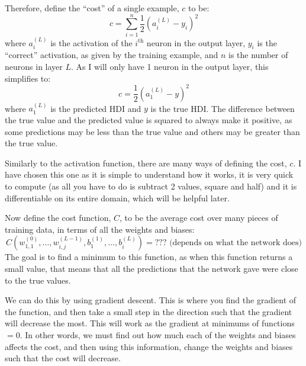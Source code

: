 \documentclass[12pt]{report}
\begin{document}
Therefore, define the ``cost'' of a single example, $c$ to be: 
\begin{equation}\label{eq:cdefinition}
    c=\displaystyle\sum_{i=1}^{n}\frac{1}{2}{\left(a^{\left(L\right)}_i-y_i\right)}^2
\end{equation}
where $a^{\left(L\right)}_i$ is the activation of the $i^{\text{th}}$ neuron in the output layer, $y_i$ is the ``correct'' activation, as given by the training example, and $n$ is the number of neurons in layer $L$. As I will only have 1 neuron in the output layer, this simplifies to:
\begin{equation}
    c=\frac{1}{2}{\left(a^{\left(L\right)}_1-y\right)}^2
\end{equation}
where $a^{\left(L\right)}_1$ is the predicted HDI and $y$ is the true HDI. The difference between the true value and the predicted value is squared to always make it positive, as some predictions may be less than the true value and others may be greater than the true value.

Similarly to the activation function, there are many ways of defining the cost, $c$. I have chosen this one as it is simple to understand how it works, it is very quick to compute (as all you have to do is subtract 2 values, square and half) and it is differentiable on its entire domain, which will be helpful later.

Now define the cost function, $C$, to be the average cost over many pieces of training data, in terms of all the weights and biases:
\begin{equation}
    C\left(w^{\left(0\right)}_{1,1},\ldots ,w^{\left(L-1\right)}_{i,j},b^{\left(1\right)}_1,\ldots ,b^{\left(L\right)}_i\right)=\text{??? (depends on what the network does)}
\end{equation}
The goal is to find a minimum to this function, as when this function returns a small value, that means that all the predictions that the network gave were close to the true values.

We can do this by using gradient descent. This is where you find the gradient of the function, and then take a small step in the direction such that the gradient will decrease the most. This will work as the gradient at minimums of functions $=0$. In other words, we must find out how much each of the weights and biases affects the cost, and then using this information, change the weights and biases such that the cost will decrease.
\end{document}
